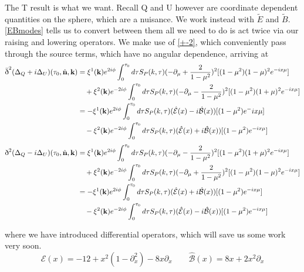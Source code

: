 \documentclass[a4paper,10pt]{article}
\renewcommand{\v}[1]{\mathbf{#1}}
\newcommand{\unit}[1]{\hat{\v{#1}}}
\newcommand{\sr}{\text{\normalfont\dh}}
\renewcommand{\sl}{\bar{\text{\normalfont\dh}}}
\begin{document}
The T result is what we want. Recall Q and U however are coordinate dependent quantities on the sphere, which are a nuisance. We work instead with $\tilde{E}$ and $\tilde{B}$. \ref{EBmodes} tells us to convert between them all we need to do is act twice via our raising and lowering operators. We make use of \ref{+-2}, which conveniently pass through the source terms, which have no angular dependence, arriving at
\begin{equation}\begin{split}
\sl^2(\Delta_Q+i\Delta_U)(\tau_0,\unit{n},\v{k}) &= \xi^1(\v{k})e^{2i\phi}\int_0^{\tau_0}d\tau S_P(k,\tau)(-\partial_\mu+\frac{2}{1-\mu^2})^2[(1-\mu^2)(1-\mu)^2 e^{-ix\mu}]\\
&\quad + \xi^2(\v{k})e^{-2i\phi}\int_0^{\tau_0}d\tau S_P(k,\tau)(-\partial_\mu-\frac{2}{1-\mu^2})^2[(1-\mu^2)(1+\mu)^2 e^{-ix\mu}]\\
&= -\xi^1(\v{k})e^{2i\phi}\int_0^{\tau_0}d\tau S_P(k,\tau)(\hat{\mathcal{E}}(x)-i\hat{\mathcal{B}}(x))[(1-\mu^2) e^-{ix\mu}] \\
&\quad - \xi^2(\v{k})e^{-2i\phi}\int_0^{\tau_0}d\tau S_P(k,\tau)(\hat{\mathcal{E}}(x)+i\hat{\mathcal{B}}(x))[(1-\mu^2) e^{-ix\mu}] 
\end{split}\end{equation}
\begin{equation}\begin{split}
\sr^2(\Delta_Q-i\Delta_U)(\tau_0,\unit{n},\v{k}) &= \xi^1(\v{k})e^{2i\phi}\int_0^{\tau_0}d\tau S_P(k,\tau)(-\partial_\mu-\frac{2}{1-\mu^2})^2[(1-\mu^2)(1+\mu)^2 e^{-ix\mu}] \\ 
&\quad + \xi^2(\v{k})e^{-2i\phi}\int_0^{\tau_0}d\tau S_P(k,\tau)(-\partial_\mu+\frac{2}{1-\mu^2})^2[(1-\mu^2)(1-\mu)^2 e^{-ix\mu}]\\
&= -\xi^1(\v{k})e^{2i\phi}\int_0^{\tau_0}d\tau S_P(k,\tau)(\hat{\mathcal{E}}(x)+i\hat{\mathcal{B}}(x))[(1-\mu^2) e^{-ix\mu}] \\
&\quad - \xi^2(\v{k})e^{-2i\phi}\int_0^{\tau_0}d\tau S_P(k,\tau)(\hat{\mathcal{E}}(x)-i\hat{\mathcal{B}}(x))[(1-\mu^2) e^{-ix\mu}] 
\end{split}\end{equation}

where we have introduced differential operators, which will save us some work very soon.
\begin{equation}
\hat{\mathcal{E}}(x)=-12+x^2(1-\partial^2_x)-8x\partial_x \qquad \mathcal{\hat{B}}(x) = 8x+2x^2\partial_x
\end{equation}
\end{document}
